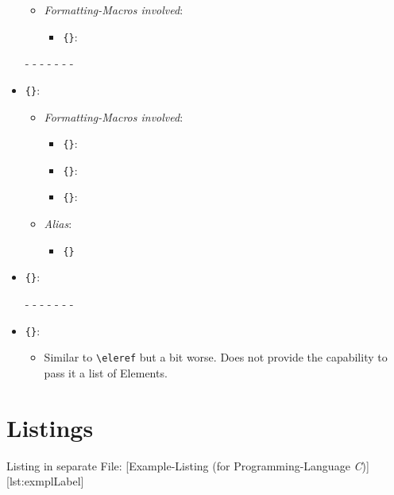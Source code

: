 \begin{itemize}
\begin{itemize}
			\item \textit{Formatting-Macros involved}:
			\begin{itemize}
				\item \texttt{\{\}}: 
			\end{itemize}
		\end{itemize}
	\item[-]- - - - - -
	\item \texttt{\{\}}: 
		\begin{itemize}
			\item \textit{Formatting-Macros involved}:
			\begin{itemize}
				\item \texttt{\{\}}: 
				\item \texttt{\{\}}: 
				\item \texttt{\{\}}: 
			\end{itemize}
			\item \textit{Alias}:
			\begin{itemize}
				\item \texttt{\{\}}
			\end{itemize}
		\end{itemize}
	\item \texttt{\{\}}: 
	\item[-]- - - - - -
	\item \texttt{\{\}}: 
		\begin{itemize}
			\item Similar to \texttt{\textbackslash eleref} but a bit worse. Does not provide the capability to pass it a list of Elements.
		\end{itemize}
\end{itemize}






\section{Listings}

Listing in separate File:
[Example-Listing (for Programming-Language \textit{C})]
[lst:exmplLabel]


